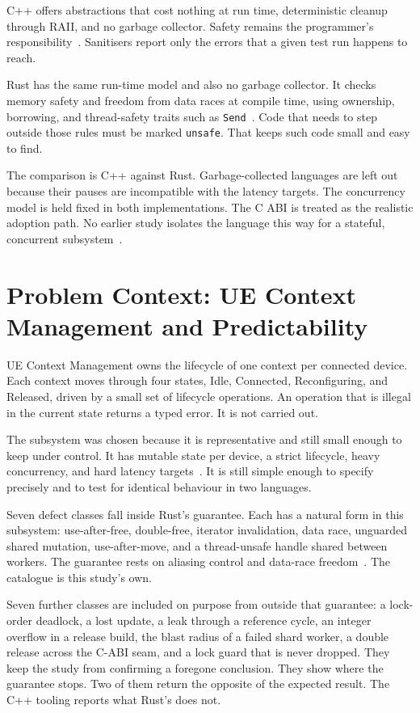 \documentclass[english,twoside,openright,a4paper,censored,csm,software-track-2020]{HYthesisML}
\begin{document}
C++ offers abstractions that cost nothing at run time, deterministic cleanup through
RAII, and no garbage collector. Safety remains the programmer's
responsibility~\cite{szekeres2013sok}. Sanitisers report only the errors that a given
test run happens to reach.

Rust has the same run-time model and also no garbage collector. It checks memory safety
and freedom from data races at compile time, using ownership, borrowing, and thread-safety
traits such as \texttt{Send}~\cite{klabnik2023rust,jung2021safe}. Code that needs to
step outside those rules must be marked \texttt{unsafe}. That keeps such code small and
easy to find.

The comparison is C++ against Rust. Garbage-collected languages are left out because
their pauses are incompatible with the latency targets. The concurrency model is held
fixed in both implementations. The C ABI is treated as the realistic adoption path. No
earlier study isolates the language this way for a stateful, concurrent
subsystem~\cite{karlback2021ran,emberg2023asn1}.

\chapter{Problem Context: UE Context Management and Predictability\label{chapter:context}}

UE Context Management owns the lifecycle of one context per connected device. Each
context moves through four states, Idle, Connected, Reconfiguring, and Released, driven
by a small set of lifecycle operations. An operation that is illegal in the current
state returns a typed error. It is not carried out.

The subsystem was chosen because it is representative and still small enough to keep
under control. It has mutable state per device, a strict lifecycle, heavy concurrency,
and hard latency targets~\cite{3gpp38913,3gpp22261}. It is still simple enough to specify
precisely and to test for identical behaviour in two languages.

Seven defect classes fall inside Rust's guarantee. Each has a natural form in this
subsystem: use-after-free, double-free, iterator invalidation, data race, unguarded
shared mutation, use-after-move, and a thread-unsafe handle shared between workers. The
guarantee rests on aliasing control and data-race freedom~\cite{jung2021safe}. The
catalogue is this study's own.

Seven further classes are included on purpose from outside that guarantee: a lock-order
deadlock, a lost update, a leak through a reference cycle, an integer overflow in a
release build, the blast radius of a failed shard worker, a double release across the
C-ABI seam, and a lock guard that is never dropped. They keep the study from confirming a
foregone conclusion. They show where the guarantee stops. Two of them return the opposite
of the expected result. The C++ tooling reports what Rust's does not.
\end{document}

